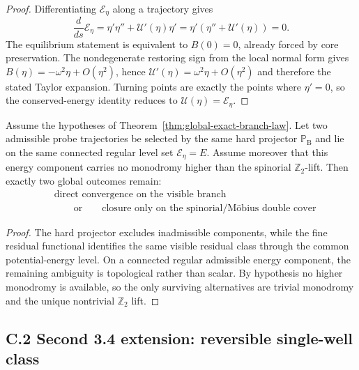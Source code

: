 \begin{proof}
Differentiating $\mathcal E_\eta$ along a trajectory gives
\[
  \frac{d}{ds}\mathcal E_\eta = \eta'\eta''+\mathcal U'(\eta)\eta' = \eta'(\eta''+\mathcal U'(\eta))=0.
\]
The equilibrium statement is equivalent to $B(0)=0$, already forced by core preservation. The nondegenerate restoring sign from the local normal form gives $B(\eta)=-\omega^2\eta + O(\eta^2)$, hence $\mathcal U'(\eta)=\omega^2\eta + O(\eta^2)$ and therefore the stated Taylor expansion. Turning points are exactly the points where $\eta'=0$, so the conserved-energy identity reduces to $\mathcal U(\eta)=\mathcal E_\eta$.
\end{proof}

\begin{proposition}
\label{prop:energy-reversal-probe}
Assume the hypotheses of Theorem~\ref{thm:global-exact-branch-law}. Let two admissible probe trajectories be selected by the same hard projector $\mathbb P_{\mathrm B}$ and lie on the same connected regular level set $\mathcal E_\eta = E$. Assume moreover that this energy component carries no monodromy higher than the spinorial $\mathbb Z_2$-lift. Then exactly two global outcomes remain:
\[
\begin{aligned}
&\text{direct convergence on the visible branch}\\[0.2em]
&\qquad \text{or} \qquad
\text{closure only on the spinorial/M\"obius double cover}
\end{aligned}
\]
\end{proposition}

\begin{proof}
The hard projector excludes inadmissible components, while the fine residual functional identifies the same visible residual class through the common potential-energy level. On a connected regular admissible energy component, the remaining ambiguity is topological rather than scalar. By hypothesis no higher monodromy is available, so the only surviving alternatives are trivial monodromy and the unique nontrivial $\mathbb Z_2$ lift.
\end{proof}


\subsection*{C.2 Second 3.4 extension: reversible single-well class}

